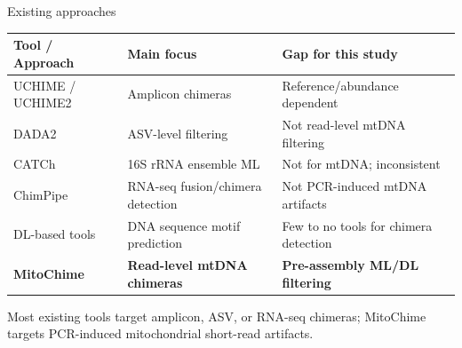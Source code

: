 \documentclass[aspectratio=169,11pt]{beamer}
\begin{document}
\begin{frame}{Existing approaches}

\scriptsize
\renewcommand{\arraystretch}{1.35}

\begin{table}
\centering
\begin{tabular}{p{} p{} p{}}
\hline
\textbf{Tool / Approach} & \textbf{Main focus} & \textbf{Gap for this study} \\
\hline
UCHIME / UCHIME2 &
Amplicon chimeras &
Reference/abundance dependent \\

DADA2 &
ASV-level filtering &
Not read-level mtDNA filtering \\

CATCh &
16S rRNA ensemble ML &
Not for mtDNA; inconsistent \\

ChimPipe &
RNA-seq fusion/chimera detection &
Not PCR-induced mtDNA artifacts \\

DL-based tools &
DNA sequence motif prediction &
Few to no tools for chimera detection \\

\textbf{MitoChime} &
\textbf{Read-level mtDNA chimeras} &
\textbf{Pre-assembly ML/DL filtering} \\
\hline
\end{tabular}
\end{table}

\vspace{0.5em}

\centering
\footnotesize
Most existing tools target amplicon, ASV, or RNA-seq chimeras; MitoChime targets PCR-induced mitochondrial short-read artifacts.

\end{frame}
\end{document}
